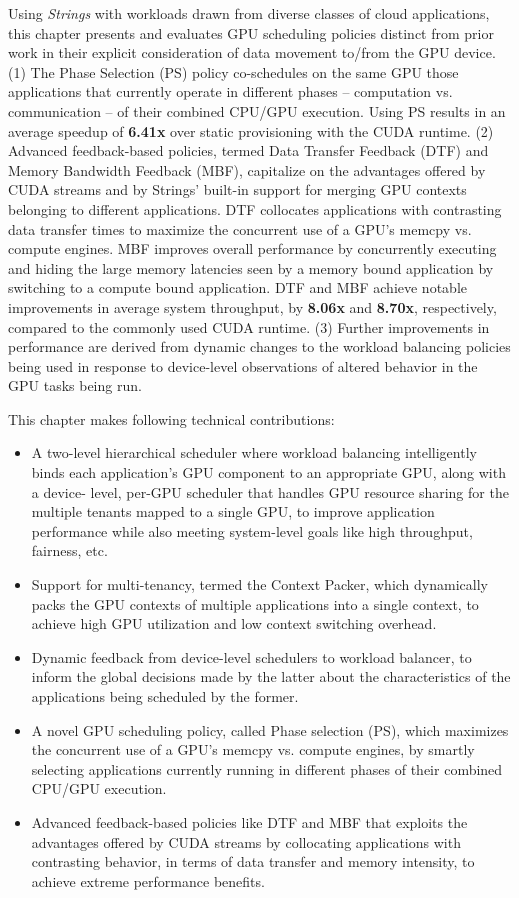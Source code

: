 Using \textit{Strings} with workloads drawn from diverse classes of cloud applications, this chapter presents and evaluates GPU scheduling policies distinct from prior work in their explicit consideration of data movement to/from the GPU device. (1) The Phase Selection (PS) policy co-schedules on the same GPU those applications that currently operate in different phases – computation vs. communication -- of their combined CPU/GPU execution. Using PS results in an average speedup of \textbf{6.41x} over static provisioning with the CUDA runtime. (2) Advanced feedback-based policies, termed Data Transfer Feedback (DTF) and Memory Bandwidth Feedback (MBF), capitalize on the advantages offered by CUDA streams and by Strings’ built-in support for merging GPU contexts belonging to different applications. DTF collocates applications with contrasting data transfer times to maximize the concurrent use of a GPU's memcpy vs. compute engines. MBF improves overall performance by concurrently executing and hiding the large memory latencies seen by a memory bound application by switching to a compute bound application. DTF and MBF achieve notable improvements in average system throughput, by \textbf{8.06x} and \textbf{8.70x}, respectively, compared to the commonly used CUDA runtime. (3) Further improvements in performance are derived from dynamic changes to the workload balancing policies being used in response to device-level observations of altered behavior in the GPU tasks being run.


This chapter makes following technical contributions:
\begin{itemize}
\item A two-level hierarchical scheduler where workload balancing intelligently binds each application’s GPU component to an appropriate GPU, along with a device- level, per-GPU scheduler that handles GPU resource sharing for the multiple tenants mapped to a single GPU, to improve application performance while also meeting system-level goals like high throughput, fairness, etc.
\item Support for multi-tenancy, termed the Context Packer, which dynamically packs the GPU contexts of multiple applications into a single context, to achieve high GPU utilization and low context switching overhead.
\item Dynamic feedback from device-level schedulers to workload balancer, to inform the global decisions made by the latter about the characteristics of the applications being scheduled by the former.
\item A novel GPU scheduling policy, called Phase selection (PS), which maximizes the concurrent use of a GPU’s memcpy vs. compute engines, by smartly selecting applications currently running in different phases of their combined CPU/GPU execution.
\item Advanced feedback-based policies like DTF and MBF that exploits the advantages offered by CUDA streams by collocating applications with contrasting behavior, in terms of data transfer and memory intensity, to achieve extreme performance benefits.
\end{itemize}


